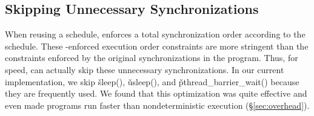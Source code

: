 




\subsection{Skipping Unnecessary Synchronizations}  \label{sec:skip-waits}

When reusing a schedule, \tern enforces a total synchronization order
according to the schedule.  These \tern-enforced execution order constraints
are more stringent than the constraints enforced by the original
synchronizations in the program.  Thus, for speed, \tern can actually skip
these unnecessary synchronizations.  In our current implementation, we
skip \v{sleep()}, \v{usleep()}, and \v{pthread\_barrier\_wait()}
because they are frequently used.  We
found that this optimization was quite effective and
even made programs run faster than nondeterministic execution
(\S\ref{sec:overhead}).


